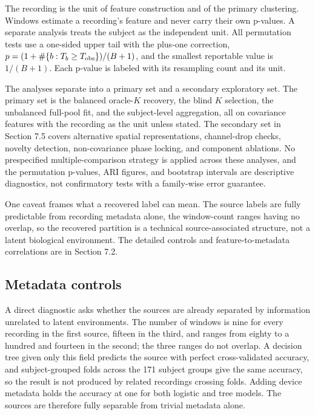 The recording is the unit of feature construction and of the primary
clustering. Windows estimate a recording's feature and never carry their
own p-values. A separate analysis treats the subject as the independent
unit. All permutation tests use a one-sided upper tail with the plus-one
correction, \(p=(1+\#\{b:T_b\ge T_{\rm obs}\})/(B+1)\), and the smallest
reportable value is \(1/(B+1)\). Each p-value is labeled with its
resampling count and its unit.

The analyses separate into a primary set and a secondary exploratory
set. The primary set is the balanced oracle-\(K\) recovery, the blind
\(K\) selection, the unbalanced full-pool fit, and the subject-level
aggregation, all on covariance features with the recording as the unit
unless stated. The secondary set in Section 7.5 covers alternative
spatial representations, channel-drop checks, novelty detection,
non-covariance phase locking, and component ablations. No prespecified
multiple-comparison strategy is applied across these analyses, and the
permutation p-values, ARI figures, and bootstrap intervals are
descriptive diagnostics, not confirmatory tests with a family-wise error
guarantee.

One caveat frames what a recovered label can mean. The source labels are
fully predictable from recording metadata alone, the window-count ranges
having no overlap, so the recovered partition is a technical
source-associated structure, not a latent biological environment. The
detailed controls and feature-to-metadata correlations are in Section
7.2.

\subsection{Metadata controls}\label{metadata-controls}

A direct diagnostic asks whether the sources are already separated by
information unrelated to latent environments. The number of windows is
nine for every recording in the first source, fifteen in the third, and
ranges from eighty to a hundred and fourteen in the second; the three
ranges do not overlap. A decision tree given only this field predicts
the source with perfect cross-validated accuracy, and subject-grouped
folds across the 171 subject groups give the same accuracy, so the
result is not produced by related recordings crossing folds. Adding
device metadata holds the accuracy at one for both logistic and tree
models. The sources are therefore fully separable from trivial metadata
alone.

